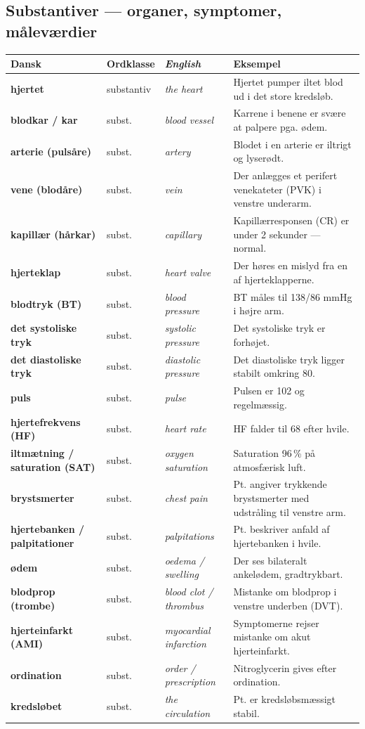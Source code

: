 \documentclass[11pt,a4paper]{report}
\makeatletter
\newcommand{\eng}[1]{\textcolor{en}{\itshape #1}}       %
\newcommand{\da}[1]{\textbf{#1}}
\newenvironment{glos}{%
  \small\renewcommand{\arraystretch}{1.35}
  \begin{longtable}{@{}>{\raggedright\arraybackslash}p{3.3cm}
                        >{\raggedright\arraybackslash}p{1.7cm}
                        >{\raggedright\arraybackslash}p{3.2cm}
                        >{\raggedright\arraybackslash}p{6.0cm}@{}}
  \toprule
  \textbf{Dansk} & \textbf{Ordklasse} & \eng{English} & \textbf{Eksempel} \\ \midrule
  \endhead
}{\bottomrule\end{longtable}}
\makeatother
\begin{document}
\subsection{Substantiver --- organer, symptomer, måleværdier}
\begin{glos}
\da{hjertet} & substantiv & \eng{the heart} & Hjertet pumper iltet blod ud i det store kredsløb. \\
\da{blodkar / kar} & subst. & \eng{blood vessel} & Karrene i benene er svære at palpere pga. ødem. \\
\da{arterie (pulsåre)} & subst. & \eng{artery} & Blodet i en arterie er iltrigt og lyserødt. \\
\da{vene (blodåre)} & subst. & \eng{vein} & Der anlægges et perifert venekateter (PVK) i venstre underarm. \\
\da{kapillær (hårkar)} & subst. & \eng{capillary} & Kapillærresponsen (CR) er under 2 sekunder --- normal. \\
\da{hjerteklap} & subst. & \eng{heart valve} & Der høres en mislyd fra en af hjerteklapperne. \\
\da{blodtryk (BT)} & subst. & \eng{blood pressure} & BT måles til 138/86 mmHg i højre arm. \\
\da{det systoliske tryk} & subst. & \eng{systolic pressure} & Det systoliske tryk er forhøjet. \\
\da{det diastoliske tryk} & subst. & \eng{diastolic pressure} & Det diastoliske tryk ligger stabilt omkring 80. \\
\da{puls} & subst. & \eng{pulse} & Pulsen er 102 og regelmæssig. \\
\da{hjertefrekvens (HF)} & subst. & \eng{heart rate} & HF falder til 68 efter hvile. \\
\da{iltmætning / saturation (SAT)} & subst. & \eng{oxygen saturation} & Saturation 96\,\% på atmosfærisk luft. \\
\da{brystsmerter} & subst. & \eng{chest pain} & Pt. angiver trykkende brystsmerter med udstråling til venstre arm. \\
\da{hjertebanken / palpitationer} & subst. & \eng{palpitations} & Pt. beskriver anfald af hjertebanken i hvile. \\
\da{ødem} & subst. & \eng{oedema / swelling} & Der ses bilateralt ankelødem, gradtrykbart. \\
\da{blodprop (trombe)} & subst. & \eng{blood clot / thrombus} & Mistanke om blodprop i venstre underben (DVT). \\
\da{hjerteinfarkt (AMI)} & subst. & \eng{myocardial infarction} & Symptomerne rejser mistanke om akut hjerteinfarkt. \\
\da{ordination} & subst. & \eng{order / prescription} & Nitroglycerin gives efter ordination. \\
\da{kredsløbet} & subst. & \eng{the circulation} & Pt. er kredsløbsmæssigt stabil. \\
\end{glos}
\end{document}
